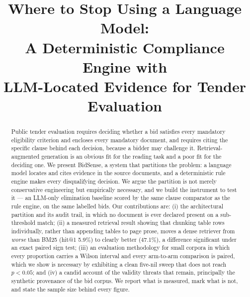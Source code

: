 \documentclass[conference]{IEEEtran}
\begin{document}
\title{Where to Stop Using a Language Model:\\
A Deterministic Compliance Engine with\\
LLM-Located Evidence for Tender Evaluation}

\author{
}

\maketitle

\begin{abstract}
Public tender evaluation requires deciding whether a bid satisfies every
mandatory eligibility criterion and encloses every mandatory document, and
requires citing the specific clause behind each decision, because a bidder may
challenge it. Retrieval-augmented generation is an obvious fit for the reading
task and a poor fit for the deciding one. We present BidSense, a system that
partitions the problem: a language model locates and cites evidence in the
source documents, and a deterministic rule engine makes every disqualifying
decision. We argue the partition is not merely conservative engineering but
empirically necessary, and we build the instrument to test it --- an LLM-only
elimination baseline scored by the same clause comparator as the rule engine, on
the same labelled bids. Our contributions are: (i) the architectural partition
and its audit trail, in which no document is ever declared present on a
sub-threshold match; (ii) a measured retrieval result showing that chunking
table rows individually, rather than appending tables to page prose, moves a
dense retriever from \emph{worse} than BM25 (hit@1 5.9\%) to clearly better
(47.1\%), a difference significant under an exact paired sign test; (iii) an
evaluation methodology for small corpora in which every proportion carries a
Wilson interval and every arm-to-arm comparison is paired, which we show is
necessary by exhibiting a clean five-nil sweep that does not reach
$p<0.05$; and (iv) a candid account of the validity threats that remain,
principally the synthetic provenance of the bid corpus. We report what is
measured, mark what is not, and state the sample size behind every figure.
\end{abstract}
\end{document}
